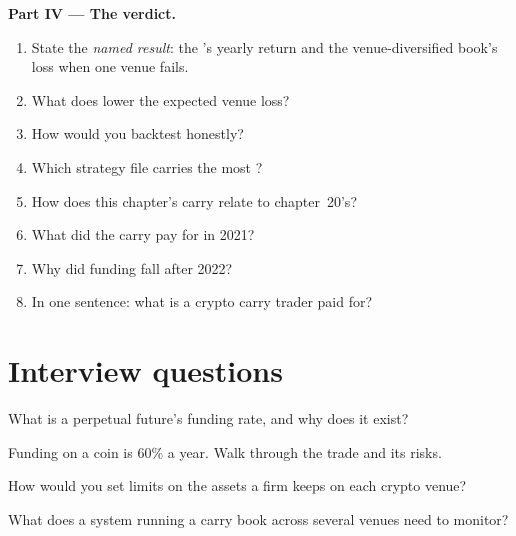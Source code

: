 \begin{problem}
\medskip\noindent\textbf{Part IV --- The verdict.}
\begin{enumerate}[resume]
\item State the \emph{named result}: the 's yearly return and the venue-diversified book's loss when one venue fails.
\item What does lower the expected venue loss?
\item How would you backtest  honestly?
\item Which strategy file carries the most ?
\item How does this chapter's carry relate to chapter~20's?
\item What did the carry pay for in 2021?
\item Why did funding fall after 2022?
\item In one sentence: what is a crypto carry trader paid for?
\end{enumerate}
\end{problem}

\section{Interview questions}

\begin{interviewq}\label{iq:s1:crypto-medium-frequency-strategies:1}
What is a perpetual future's funding rate, and why does it exist?
\end{interviewq}

\begin{interviewq}\label{iq:s1:crypto-medium-frequency-strategies:2}
Funding on a coin is 60\% a year. Walk through the trade and its risks.
\end{interviewq}

\begin{interviewq}\label{iq:s1:crypto-medium-frequency-strategies:3}
How would you set limits on the assets a firm keeps on each crypto venue?
\end{interviewq}

\begin{interviewq}\label{iq:s1:crypto-medium-frequency-strategies:4}
What does a system running a carry book across several venues need to monitor?
\end{interviewq}

